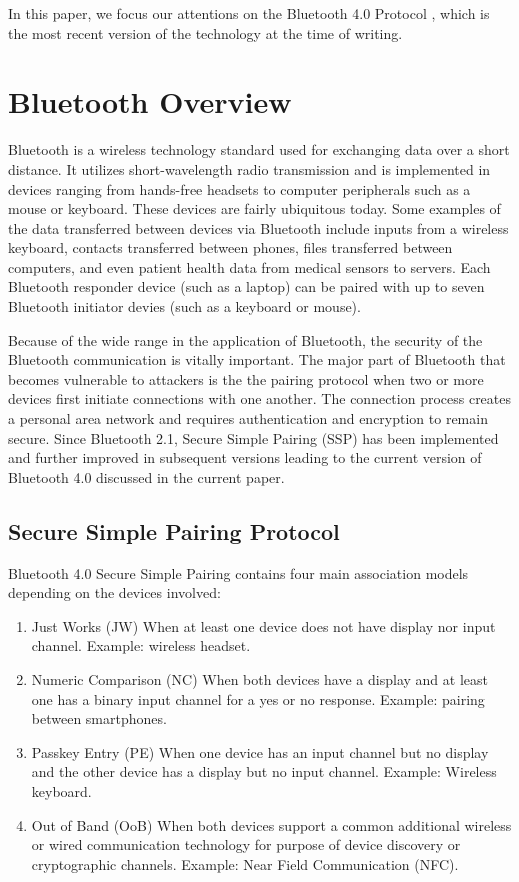 \documentclass{acm_proc_article-sp}
\begin{document}
In this paper, we focus our attentions on the Bluetooth 4.0 Protocol \cite{bluetooth:sig4}, which is the most recent version of the technology at the time of writing.


\section{Bluetooth Overview}
Bluetooth is a wireless technology standard used for exchanging data over a short distance. It utilizes short-wavelength radio transmission and is implemented in devices ranging from hands-free headsets to computer peripherals such as a mouse or keyboard. These devices are fairly ubiquitous today. Some examples of the data transferred between devices via Bluetooth include inputs from a wireless keyboard, contacts transferred between phones, files transferred between computers, and even patient health data from medical sensors to servers. Each Bluetooth responder device (such as a laptop) can be paired with up to seven Bluetooth initiator devies (such as a keyboard or mouse).

Because of the wide range in the application of Bluetooth, the security of the Bluetooth communication is vitally important. The major part of Bluetooth that becomes vulnerable to attackers is the the pairing protocol when two or more devices first initiate connections with one another. The connection process creates a personal area network and requires authentication and encryption to remain secure. Since Bluetooth 2.1, Secure Simple Pairing (SSP) has been implemented and further improved in subsequent versions leading to the current version of Bluetooth 4.0 discussed in the current paper.

\subsection{Secure Simple Pairing Protocol}

Bluetooth 4.0 Secure Simple Pairing contains four main association models depending on the devices involved:
\begin{enumerate}[1.]
    \item{Just Works (JW)} When at least one device does not have display nor input channel. Example: wireless headset.
    \item{Numeric Comparison (NC)} When both devices have a display and at least one has a binary input channel for a yes or no response. Example: pairing between smartphones.
    \item{Passkey Entry (PE)} When one device has an input channel but no display and the other device has a display but no input channel. Example: Wireless keyboard.
    \item{Out of Band (OoB)} When both devices support a common additional wireless or wired communication technology for purpose of device discovery or cryptographic channels. Example: Near Field Communication (NFC).
\end{enumerate}
\end{document}
